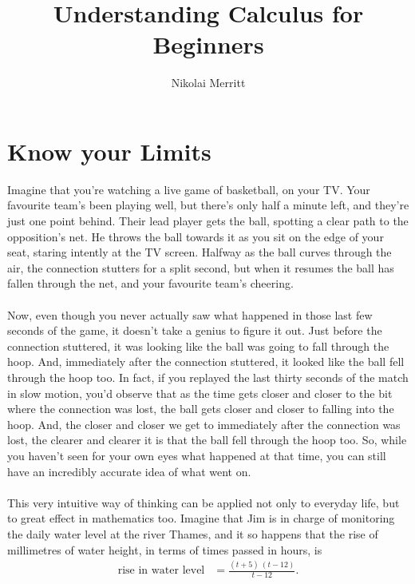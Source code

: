 \documentclass[11pt]{article}
\author{Nikolai Merritt}
\title{Understanding Calculus for Beginners}
\date{\vspace{-5ex}}
\numberwithin{equation}{section}
\begin{document}
\newcommand{\D}[2]{\frac{\textrm{d}#1}{\textrm{d}#2}}
\maketitle

\newpage
\section{Know your Limits}
Imagine that you're watching a live game of basketball, on your TV. Your favourite team's been playing well, but there's only half a minute left, and they're just one point behind. Their lead player gets the ball, spotting a clear path to the opposition's net. He throws the ball towards it as you sit on the edge of your seat, staring intently at the TV screen. Halfway as the ball curves through the air, the connection stutters for a split second, but when it resumes the ball has fallen through the net, and your favourite team's cheering. 
\\ \\
Now, even though you never actually saw what happened in those last few seconds of the game, it doesn't take a genius to figure it out. Just before the connection stuttered, it was looking like the ball was going to fall through the hoop. And, immediately after the connection stuttered, it looked like the ball fell through the hoop too. In fact, if you replayed the last thirty seconds of the match in slow motion, you'd observe that as the time gets closer and closer to the bit where the connection was lost, the ball gets closer and closer to falling into the hoop. And, the closer and closer we get to immediately after the connection was lost, the clearer and clearer it is that the ball fell through the hoop too. So, while you haven't seen for your own eyes what happened at that time, you can still have an incredibly accurate idea of what went on.  
\\ \\
This very intuitive way of thinking can be applied not only to everyday life, but to great effect in mathematics too. Imagine that Jim is in charge of monitoring the daily water level at the river Thames, and it so happens that the rise of millimetres of water height, in terms of times passed in hours, is
\begin{align*}
\textrm{rise in water level} &= \frac{(t + 5) \ (t - 12)}{t - 12}.
\end{align*}
\\ \\
\end{document}
